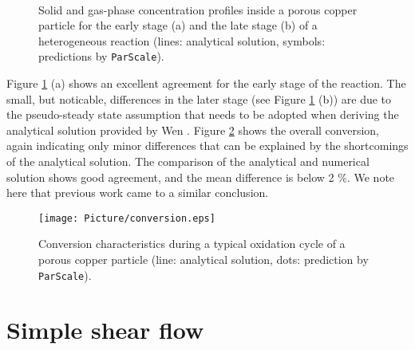 \documentclass{particles2015}
\begin{document}
\begin{figure}[h!]
\centering
{}
\hspace{0.3cm}
\\
\caption{Solid and gas-phase concentration profiles inside a porous copper particle for the early stage (a) and the late stage (b) of a heterogeneous reaction (lines: analytical solution, symbols: predictions by \texttt{ParScale}).}
\label{fig:reaction_stages}
\end{figure}

Figure \ref{fig:reaction_stages} (a) shows an excellent agreement for the early stage of the reaction. The small, but noticable, differences in the later stage (see Figure \ref{fig:reaction_stages} (b)) are due to the pseudo-steady state assumption that needs to be adopted when deriving the analytical solution provided by Wen \cite{Wen}. Figure \ref{fig:Conversion} shows the overall conversion, again indicating only minor differences that can be explained by the shortcomings of the analytical solution. The comparison of the analytical and numerical solution shows good agreement, and the mean difference is below 2 $\%$. We note here that previous work \cite{Noorman2011} came to a similar conclusion. 

\begin{figure}[h!]
   \centering
   \texttt{[image: Picture/conversion.eps]}
   \caption{Conversion characteristics during a typical oxidation cycle of a porous copper particle (line: analytical solution, dots: prediction by \texttt{ParScale}).}
   \label{fig:Conversion}
\end{figure}


\newpage
\section{Simple shear flow}
\label{sec:simple_shear}
\end{document}
